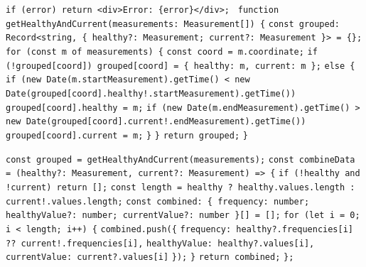 \begin{algorithmic}[1]
	\STATE \hspace{0.5cm} \texttt{if (error) return <div>Error: \{error\}</div>; }
	\STATE \hspace{0.5cm} \texttt{function getHealthyAndCurrent(measurements: Measurement[]) \{}
	\STATE \hspace{1.0cm} \texttt{const grouped: Record<string, \{ healthy?: Measurement; current?: Measurement \}> = \{\};}
	\STATE \hspace{1.0cm} \texttt{for (const m of measurements) \{}
	\STATE \hspace{1.5cm} \texttt{const coord = m.coordinate;}
	\STATE \hspace{1.5cm} \texttt{if (!grouped[coord]) grouped[coord] = \{ healthy: m, current: m \};}
	\STATE \hspace{1.5cm} \texttt{else \{}
	\STATE \hspace{2.0cm} \texttt{if (new Date(m.startMeasurement).getTime() < new Date(grouped[coord].healthy!.startMeasurement).getTime()) grouped[coord].healthy = m;}
	\STATE \hspace{2.0cm} \texttt{if (new Date(m.endMeasurement).getTime() > new Date(grouped[coord].current!.endMeasurement).getTime()) grouped[coord].current = m;}
	\STATE \hspace{1.5cm} \texttt{\}}
	\STATE \hspace{1.0cm} \texttt{\}}
	\STATE \hspace{1.0cm} \texttt{return grouped;}
	\STATE \hspace{0.5cm} \texttt{\}}
	
	\STATE
	\STATE \hspace{0.5cm} \texttt{const grouped = getHealthyAndCurrent(measurements);}
	\STATE
	\STATE \hspace{0.5cm} \texttt{const combineData = (healthy?: Measurement, current?: Measurement) => \{}
	\STATE \hspace{1.0cm} \texttt{if (!healthy and !current) return [];}
	\STATE \hspace{1.0cm} \texttt{const length = healthy ? healthy.values.length : current!.values.length;}
	\STATE \hspace{1.0cm} \texttt{const combined: \{ frequency: number; healthyValue?: number; currentValue?: number \}[] = [];}
	\STATE \hspace{1.0cm} \texttt{for (let i = 0; i < length; i++) \{}
	\STATE \hspace{1.5cm} \texttt{combined.push(\{}
	\STATE \hspace{2.0cm} \texttt{frequency: healthy?.frequencies[i] ?? current!.frequencies[i],}
	\STATE \hspace{2.0cm} \texttt{healthyValue: healthy?.values[i],}
	\STATE \hspace{2.0cm} \texttt{currentValue: current?.values[i]}
	\STATE \hspace{1.5cm} \texttt{\});}
	\STATE \hspace{1.0cm} \texttt{\}}
	\STATE \hspace{1.0cm} \texttt{return combined;}
	\STATE \hspace{0.5cm} \texttt{\};}
	

\end{algorithmic}
